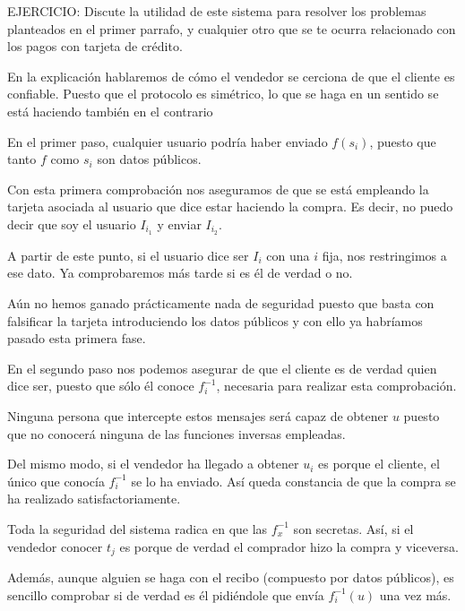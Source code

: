 \begin{problem}[3]
EJERCICIO: Discute la utilidad de este sistema para resolver los
problemas planteados en el primer parrafo, y cualquier otro que se
te ocurra relacionado con los pagos con tarjeta de crédito.
\solution


En la explicación hablaremos de cómo el vendedor se cerciona de que el cliente es confiable. Puesto que el protocolo es simétrico, lo que se haga en un sentido se está haciendo también en el contrario

En el primer paso, cualquier usuario podría haber enviado $f(s_i)$, puesto que tanto $f$ como $s_i$ son datos públicos.

Con esta primera comprobación nos aseguramos de que se está empleando la tarjeta asociada al usuario que dice estar haciendo la compra. Es decir, no puedo decir que soy el usuario $I_{i_1}$ y enviar $I_{i_2}$.

A partir de este punto, si el usuario dice ser $I_i$ con una $i$ fija, nos restringimos a ese dato. Ya comprobaremos más tarde si es él de verdad o no.

Aún no hemos ganado prácticamente nada de seguridad puesto que basta con falsificar la tarjeta introduciendo los datos públicos y con ello ya habríamos pasado esta primera fase.

En el segundo paso nos podemos asegurar de que el cliente es de verdad quien dice ser, puesto que sólo él conoce $f^{-1}_i$, necesaria para realizar esta comprobación.

Ninguna persona que intercepte estos mensajes será capaz de obtener $u$ puesto que no conocerá ninguna de las funciones inversas empleadas.

Del mismo modo, si el vendedor ha llegado a obtener $u_i$ es porque el cliente, el único que conocía $f_i^{-1}$ se lo ha enviado. Así queda constancia de que la compra se ha realizado satisfactoriamente.

Toda la seguridad del sistema radica en que las $f_x^{-1}$ son secretas. Así, si el vendedor conocer $t_j$ es porque de verdad el comprador hizo la compra y viceversa.

Además, aunque alguien se haga con el recibo (compuesto por datos públicos), es sencillo comprobar si de verdad es él pidiéndole que envía $f_i^{-1}(u)$ una vez más.

\end{problem}

